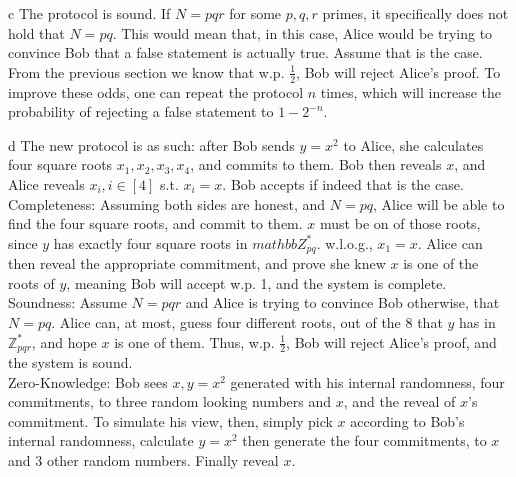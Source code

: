 \documentclass{article}
\begin{document}
\begin{paragraph}
    c The protocol is sound. If \(N = pqr\) for some \(p, q, r\) primes, it specifically does not hold that \(N = pq\). This would mean that, in this case, Alice would be trying to convince Bob that a false statement is actually true. Assume that is the case. From the previous section we know that w.p. \(\frac{1}{2}\), Bob will reject Alice's proof. To improve these odds, one can repeat the protocol $n$ times, which will increase the probability of rejecting a false statement to $1 - 2^{-n}$.
\end{paragraph}

\begin{paragraph}
    d The new protocol is as such: after Bob sends \(y = x^2\) to Alice, she calculates four square roots \(x_1, x_2, x_3, x_4\), and commits to them. Bob then reveals \(x\), and Alice reveals \(x_i, i \in [4]\) s.t. \(x_i = x\). Bob accepts if indeed that is the case.\\
    
    Completeness: Assuming both sides are honest, and \(N = pq\), Alice will be able to find the four square roots, and commit to them. \(x\) must be on of those roots, since \(y\) has exactly four square roots in \(mathbb{Z}^*_{pq}\). w.l.o.g., \(x_1 = x\). Alice can then reveal the appropriate commitment, and prove she knew \(x\) is one of the roots of \(y\), meaning Bob will accept w.p. 1, and the system is complete.\\
    
    Soundness: Assume \(N = pqr\) and Alice is trying to convince Bob otherwise, that \(N = pq\). Alice can, at most, guess four different roots, out of the 8 that \(y\) has in \(\mathbb{Z}^*_{pqr}\), and hope \(x\) is one of them. Thus, w.p. \(\frac{1}{2}\), Bob will reject Alice's proof, and the system is sound.\\
    
    Zero-Knowledge: Bob sees \(x, y = x^2\) generated with his internal randomness, four commitments, to three random looking numbers and \(x\), and the reveal of \(x\)'s commitment. To simulate his view, then, simply pick \(x\) according to Bob's internal randomness, calculate \(y = x^2\) then generate the four commitments, to \(x\) and 3 other random numbers. Finally reveal \(x\).
\end{paragraph}
\end{document}
